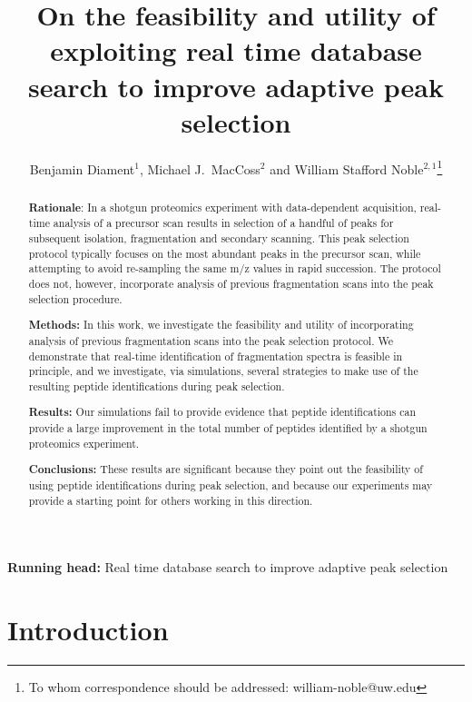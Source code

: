 \documentclass[12pt]{article}
\begin{document}
\title{On the feasibility and utility of exploiting real time database
  search to improve adaptive peak selection}
\author{Benjamin Diament$^1$, Michael J.\ MacCoss$^2$ and William
  Stafford Noble$^{2,1}$\footnote{To whom correspondence should be
    addressed: william-noble@uw.edu}}
\date{}
\maketitle

{\bf Running head:} Real time database search to improve adaptive peak
selection


\begin{abstract}

{\bf Rationale}: In a shotgun proteomics experiment with
data-dependent acquisition, real-time analysis of a precursor scan
results in selection of a handful of peaks for subsequent isolation,
fragmentation and secondary scanning.  This peak selection protocol
typically focuses on the most abundant peaks in the precursor scan,
while attempting to avoid re-sampling the same m/z values in rapid
succession.  The protocol does not, however, incorporate analysis of
previous fragmentation scans into the peak selection procedure.

{\bf Methods:} In this work, we investigate the feasibility and
utility of incorporating analysis of previous fragmentation scans into
the peak selection protocol.  We demonstrate that real-time
identification of fragmentation spectra is feasible in principle, and
we investigate, via simulations, several strategies to make use of the
resulting peptide identifications during peak selection.

{\bf Results:} Our simulations fail to provide evidence that peptide
identifications can provide a large improvement in the total number of
peptides identified by a shotgun proteomics experiment.

{\bf Conclusions:} These results are significant because they point
out the feasibility of using peptide identifications during peak
selection, and because our experiments may provide a starting point
for others working in this direction.
\end{abstract}

\clearpage

\section*{Introduction}
\end{document}
